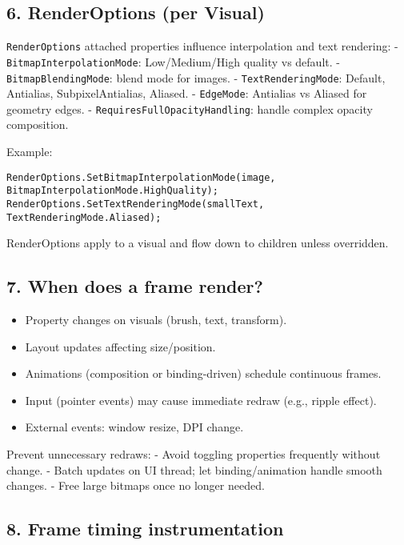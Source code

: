 \subsection{6. RenderOptions (per
Visual)}\label{renderoptions-per-visual}

\passthrough{\lstinline!RenderOptions!} attached properties influence
interpolation and text rendering: -
\passthrough{\lstinline!BitmapInterpolationMode!}: Low/Medium/High
quality vs default. - \passthrough{\lstinline!BitmapBlendingMode!}:
blend mode for images. - \passthrough{\lstinline!TextRenderingMode!}:
Default, Antialias, SubpixelAntialias, Aliased. -
\passthrough{\lstinline!EdgeMode!}: Antialias vs Aliased for geometry
edges. - \passthrough{\lstinline!RequiresFullOpacityHandling!}: handle
complex opacity composition.

Example:

\begin{lstlisting}
RenderOptions.SetBitmapInterpolationMode(image, BitmapInterpolationMode.HighQuality);
RenderOptions.SetTextRenderingMode(smallText, TextRenderingMode.Aliased);
\end{lstlisting}

RenderOptions apply to a visual and flow down to children unless
overridden.

\subsection{7. When does a frame
render?}\label{when-does-a-frame-render}

\begin{itemize}
\tightlist
\item
  Property changes on visuals (brush, text, transform).
\item
  Layout updates affecting size/position.
\item
  Animations (composition or binding-driven) schedule continuous frames.
\item
  Input (pointer events) may cause immediate redraw (e.g., ripple
  effect).
\item
  External events: window resize, DPI change.
\end{itemize}

Prevent unnecessary redraws: - Avoid toggling properties frequently
without change. - Batch updates on UI thread; let binding/animation
handle smooth changes. - Free large bitmaps once no longer needed.

\subsection{8. Frame timing
instrumentation}\label{frame-timing-instrumentation}

